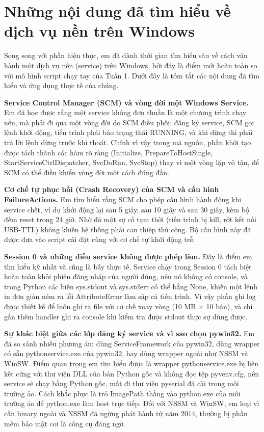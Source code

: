 \documentclass[12pt,a4paper]{article}
\begin{document}
\section{Những nội dung đã tìm hiểu về dịch vụ nền trên Windows}
Song song với phần hiện thực, em đã dành thời gian tìm hiểu sâu về cách vận hành một dịch vụ nền (service) trên Windows, bởi đây là điểm mới hoàn toàn so với mô hình script chạy tay của Tuần 1. Dưới đây là tóm tắt các nội dung đã tìm hiểu và ứng dụng thực tế của chúng.

\noindent\textbf{Service Control Manager (SCM) và vòng đời một Windows Service.} Em đã học được rằng một service không đơn thuần là một chương trình chạy nền, mà phải đi qua một vòng đời do SCM điều phối: đăng ký service, SCM gọi lệnh khởi động, tiến trình phải báo trạng thái RUNNING, và khi dừng thì phải trả lời lệnh dừng trước khi thoát. Chính vì vậy trong mã nguồn, phần khởi tạo được tách thành các hàm rõ ràng (Initialize, PrepareToHostSingle, StartServiceCtrlDispatcher, SvcDoRun, SvcStop) thay vì một vòng lặp vô tận, để SCM có thể điều khiển vòng đời một cách đúng đắn.\par
\noindent\textbf{Cơ chế tự phục hồi (Crash Recovery) của SCM và cấu hình FailureActions.} Em tìm hiểu rằng SCM cho phép cấu hình hành động khi service chết, ví dụ khởi động lại sau 5 giây, sau 10 giây và sau 30 giây, kèm bộ đếm reset trong 24 giờ. Nhờ đó một sự cố tạm thời (tiến trình bị kill, rớt kết nối USB-TTL) không khiến hệ thống phải can thiệp thủ công. Bộ cấu hình này đã được đưa vào script cài đặt cùng với cơ chế tự khởi động trễ.\par
\noindent\textbf{Session 0 và những điều service không được phép làm.} Đây là điểm em tìm hiểu kỹ nhất và cũng là bẫy thực tế. Service chạy trong Session 0 tách biệt hoàn toàn khỏi phiên đăng nhập của người dùng, nên nó không có console, và trong Python các biến sys.stdout và sys.stderr có thể bằng None, khiến một lệnh in đơn giản ném ra lỗi AttributeError làm sập cả tiến trình. Vì vậy phần ghi log được thiết kế để luôn ghi ra file với cơ chế xoay vòng (10 MB × 10 bản), và chỉ gắn thêm handler ghi ra console khi kiểm tra được stdout thực sự dùng được.\par
\noindent\textbf{Sự khác biệt giữa các lớp đăng ký service và vì sao chọn pywin32.} Em đã so sánh nhiều phương án: dùng ServiceFramework của pywin32, dùng wrapper có sẵn pythonservice.exe của pywin32, hay dùng wrapper ngoài như NSSM và WinSW. Điểm quan trọng em tìm hiểu được là wrapper pythonservice.exe bị liên kết cứng với thư viện DLL của bản Python gốc và không đọc tệp pyvenv.cfg, nên service sẽ chạy bằng Python gốc, mất đi thư viện pyserial đã cài trong môi trường ảo. Cách khắc phục là trỏ ImagePath thẳng vào python.exe của môi trường ảo để python.exe làm host trực tiếp. Đối với NSSM và WinSW, em loại vì cần binary ngoài và NSSM đã ngừng phát hành từ năm 2014, thường bị phần mềm bảo mật coi là công cụ đáng ngờ.\par
\end{document}
